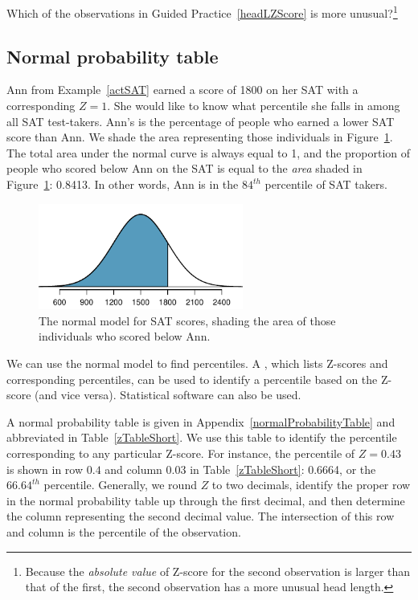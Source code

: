 \begin{exercise}
Which of the observations in Guided Practice~\ref{headLZScore} is more unusual?\footnote{Because the \emph{absolute value} of Z-score for the second observation is larger than that of the first, the second observation has a more unusual head length.}
\end{exercise}

\subsection{Normal probability table}

\begin{example}{Ann from Example~\ref{actSAT} earned a score of 1800 on her SAT with a corresponding $Z=1$. She would like to know what percentile she falls in among all SAT test-takers.}
Ann's  is the percentage of people who earned a lower SAT score than Ann. We shade the area representing those individuals in Figure~\ref{satBelow1800}. The total area under the normal curve is always equal to 1, and the proportion of people who scored below Ann on the SAT is equal to the \emph{area} shaded in Figure~\ref{satBelow1800}: 0.8413. In other words, Ann is in the $84^{th}$ percentile of SAT takers.
\end{example}

\begin{figure}[htb]
   \centering
   \includegraphics[width=0.6\textwidth]{ch_distributions/figures/satBelow1800/satBelow1800}
   \caption{The normal model for SAT scores, shading the area of those individuals who scored below Ann.}
   \label{satBelow1800}
\end{figure}

We can use the normal model to find percentiles. A , which lists Z-scores and corresponding percentiles, can be used to identify a percentile based on the Z-score (and vice versa). Statistical software can also be used.

A normal probability table is given in Appendix~\vref{normalProbabilityTable} and abbreviated in Table~\ref{zTableShort}. We use this table to identify the percentile corresponding to any particular Z-score. For instance, the percentile of $Z=0.43$ is shown in row $0.4$ and column $0.03$ in Table~\ref{zTableShort}: 0.6664, or the $66.64^{th}$ percentile. Generally, we round $Z$ to two decimals, identify the proper row in the normal probability table up through the first decimal, and then determine the column representing the second decimal value. The intersection of this row and column is the percentile of the observation.

